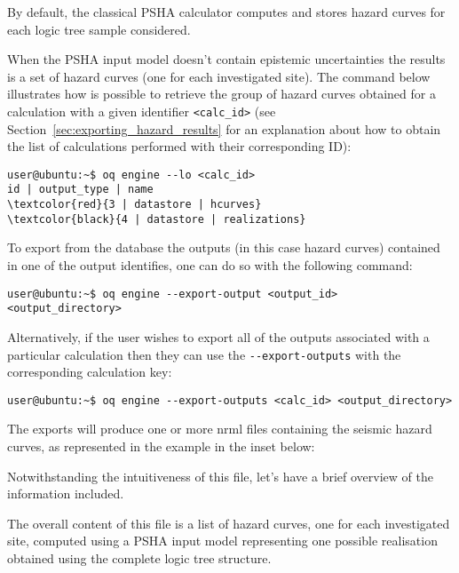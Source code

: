 By default, the classical PSHA calculator computes and stores hazard curves
for each logic tree sample considered.

When the PSHA input model doesn't contain epistemic uncertainties the results
is a set of hazard curves (one for each investigated site). The command below
illustrates how is possible to retrieve the group of hazard curves obtained
for a calculation with a given identifier \texttt{<calc\_id>} (see
Section~\ref{sec:exporting_hazard_results} for an explanation about how to
obtain the list of calculations performed with their corresponding ID):

\begin{Verbatim}[frame=single, commandchars=\\\{\}, fontsize=\small]
user@ubuntu:~$ oq engine --lo <calc_id>
id | output_type | name
\textcolor{red}{3 | datastore | hcurves}
\textcolor{black}{4 | datastore | realizations}
\end{Verbatim}

To export from the database the outputs (in this case hazard curves)  contained in one of the output identifies, one can do so with the following command:

\begin{Verbatim}[frame=single, commandchars=\\\{\}, fontsize=\small]
user@ubuntu:~$ oq engine --export-output <output_id> <output_directory>
\end{Verbatim}

Alternatively, if the user wishes to export all of the outputs associated with a particular calculation then they can use the \texttt{-{}-export-outputs} with the corresponding calculation key:

\begin{Verbatim}[frame=single, commandchars=\\\{\}, fontsize=\small]
user@ubuntu:~$ oq engine --export-outputs <calc_id> <output_directory>
\end{Verbatim}

The exports will produce one or more nrml files containing the seismic hazard curves, as represented in the example in the inset
below:



Notwithstanding the intuitiveness of this file, let's have a brief
overview of the information included.

The overall content of this file is a list of hazard curves, one for each
investigated site, computed using a PSHA input model representing one possible
realisation obtained using the complete logic tree structure.

